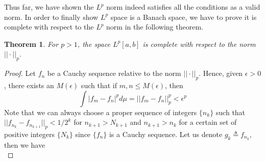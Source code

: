 \documentclass[12pt]{amsart}
\theoremstyle{plain}
\newtheorem{thm}{Theorem}[section]
\theoremstyle{definition}
\theoremstyle{remark}
\numberwithin{equation}{section}
\numberwithin{thm}{section}
\begin{document}
Thus far, we have shown the $L^p$ norm indeed satisfies all the conditions as a valid norm. In order to finally show $L^p$ space is a Banach space, we have to prove it is complete with respect to the $L^p$ norm in the following theorem.
\begin{thm}
    For $p>1$, the space $L^p[a,b]$ is complete with respect to the norm $||\cdot||_p$.
\end{thm}
 \begin{proof}

Let ${f_n}$ be a Cauchy sequence relative to the norm $||\cdot||_p$. Hence, given $\epsilon>0$, there exists an $M(\epsilon)$ such that if $m,n \leq M(\epsilon)$, then
\begin{equation} \label{eqn:epsil2}
    \int |f_m - f_n|^p d\mu = || f_m -f_n ||_{p}^p < \epsilon^p
\end{equation}
Note that we can always choose a proper sequence of integers $\{n_{k}\}$ such that $||f_{n_k} - f_{n_{k+1}}||_p < 1/2^k$ for $n_{k+1} > N_{k+1}$ and $n_{k+1} > n_k$ for a certain set of positive integers $\{N_k\}$ since $\{f_n\}$ is a Cauchy sequence. Let us denote $g_k \triangleq f_{n_k}$, then we have 
\begin{equation*}

\end{equation*}
\end{proof}
\end{document}
